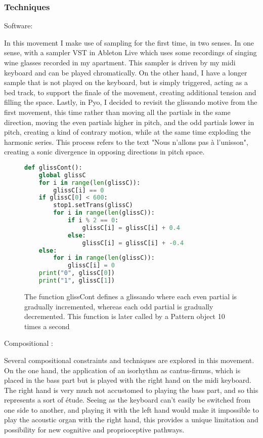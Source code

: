 \documentclass[12pt,twoside,maitrise]{dms}
\theoremstyle{definition}
\begin{document}
\subsubsection{Techniques}

Software:

In this movement I make use of sampling for the first time, in two senses.
In one sense, with a sampler VST in Ableton Live which uses some recordings of singing wine glasses recorded in my apartment.
This sampler is driven by my midi keyboard and can be played chromatically.
On the other hand, I have a longer sample that is not played on the keyboard, but is simply triggered, acting as a bed track, to support the finale of the movement, creating additional tension and filling the space.
Lastly, in Pyo, I decided to revisit the glissando motive from the first movement, this time rather than moving all the partials in the same direction, moving the even partials higher in pitch, and the odd partials lower in pitch, creating a kind of contrary motion, while at the same time exploding the harmonic series.
This process refers to the text "Nous n'allons pas à l'unisson", creating a sonic divergence in opposing directions in pitch space.

\begin{figure}[H]
\begin{lstlisting}[language=Python]
def glissCont():
    global glissC
    for i in range(len(glissC)):
        glissC[i] == 0
    if glissC[0] < 600:
        stop1.setTrans(glissC)
        for i in range(len(glissC)):
            if i % 2 == 0:
                glissC[i] = glissC[i] + 0.4
            else:
                glissC[i] = glissC[i] + -0.4
    else:
        for i in range(len(glissC)):
            glissC[i] = 0
    print("0", glissC[0])
    print("1", glissC[1])
\end{lstlisting}
\caption{The function glissCont defines a glissando where each even partial is gradually incremented, whereas each odd partial is gradually decremented. This function is later called by a Pattern object 10 times a second}
\end{figure}

Compositional :

Several compositional constraints and techniques are explored in this movement.
On the one hand, the application of an isorhythm as cantus-firmus, which is placed in the bass part but is played with the right hand on the midi keyboard.
The right hand is very much not accustomed to playing the bass part, and so this represents a sort of étude.
Seeing as the keyboard can't easily be switched from one side to another, and playing it with the left hand would make it impossible to play the acoustic organ with the right hand, this provides a unique limitation and possibility for new cognitive and proprioceptive pathways.
\end{document}
